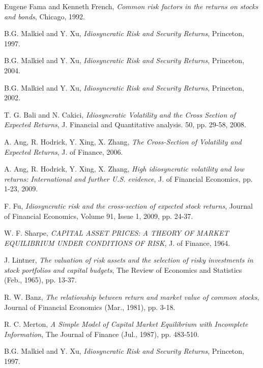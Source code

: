 \begin{thebibliography}{9}

Eugene Fama and Kenneth French, \textit{Common risk factors in the returns on stocks and bonds}, Chicago, 1992.

B.G. Malkiel and Y. Xu, \textit{Idiosyncratic Risk and Security Returns}, Princeton, 1997.

B.G. Malkiel and Y. Xu, \textit{Idiosyncratic Risk and Security Returns}, Princeton, 2004.

B.G. Malkiel and Y. Xu, \textit{Idiosyncratic Risk and Security Returns}, Princeton, 2002.

T. G. Bali and N. Cakici, \textit{Idiosyncratic Volatility and the Cross Section of
Expected Returns}, J. Financial and Quantitative analysis. 50, pp. 29-58, 2008.

A. Ang, R. Hodrick, Y. Xing, X. Zhang, \textit{The Cross-Section of Volatility and Expected Returns}, J. of Finance, 2006.

A. Ang, R. Hodrick, Y. Xing, X. Zhang, \textit{High idiosyncratic volatility and low returns: International and further U.S. evidence}, J. of Financial Economics, pp. 1-23, 2009.

F. Fu, \textit{Idiosyncratic risk and the cross-section of expected stock returns}, Journal of Financial Economics, Volume 91, Issue 1, 2009, pp. 24-37.

W. F. Sharpe, \textit{CAPITAL ASSET PRICES: A THEORY OF MARKET
EQUILIBRIUM UNDER CONDITIONS OF RISK}, J. of Finance, 1964.

J. Lintner, \textit{The valuation of risk assets and the selection of risky investments in stock portfolios and capital budgets}, The Review of Economics and Statistics (Feb., 1965), pp. 13-37.

R. W. Banz, \textit{The relationship between return and market value of common stocks}, Journal of Financial Economics (Mar., 1981), pp. 3-18.

R. C. Merton, \textit{A Simple Model of Capital Market Equilibrium with Incomplete Information}, The Journal of Finance (Jul., 1987), pp. 483-510.

B.G. Malkiel and Y. Xu, \textit{Idiosyncratic Risk and Security Returns}, Princeton, 1997.


\end{thebibliography}
